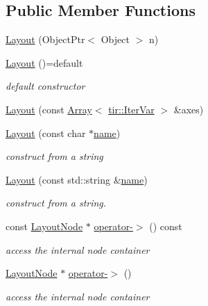 \subsection*{Public Member Functions}
\begin{DoxyCompactItemize}
\item 
\hyperlink{classtvm_1_1tir_1_1Layout_abf3ba7ad67d43133c8f4f9beb21edf32}{Layout} (Object\+Ptr$<$ Object $>$ n)
\item 
\hyperlink{classtvm_1_1tir_1_1Layout_a585c5a7813852d9741a7a739c4e2cbad}{Layout} ()=default
\begin{DoxyCompactList}\small\item\em default constructor \end{DoxyCompactList}\item 
\hyperlink{classtvm_1_1tir_1_1Layout_ace4d6c608f7148bb2c6aefe33b4e4ab5}{Layout} (const \hyperlink{classtvm_1_1Array}{Array}$<$ \hyperlink{classtvm_1_1tir_1_1IterVar}{tir\+::\+Iter\+Var} $>$ \&axes)
\item 
\hyperlink{classtvm_1_1tir_1_1Layout_a11a8465c3cc562e408a48a7f0fd324fd}{Layout} (const char $\ast$\hyperlink{classtvm_1_1tir_1_1Layout_a9c22206c841f0f09e20d56b9c96b321d}{name})
\begin{DoxyCompactList}\small\item\em construct from a string \end{DoxyCompactList}\item 
\hyperlink{classtvm_1_1tir_1_1Layout_a7cece4c969caab17658f4e70fa6a69e5}{Layout} (const std\+::string \&\hyperlink{classtvm_1_1tir_1_1Layout_a9c22206c841f0f09e20d56b9c96b321d}{name})
\begin{DoxyCompactList}\small\item\em construct from a string. \end{DoxyCompactList}\item 
const \hyperlink{classtvm_1_1tir_1_1LayoutNode}{Layout\+Node} $\ast$ \hyperlink{classtvm_1_1tir_1_1Layout_aef6a0989eb7c1a0b9a0707a465cbaa9b}{operator-\/$>$} () const 
\begin{DoxyCompactList}\small\item\em access the internal node container \end{DoxyCompactList}\item 
\hyperlink{classtvm_1_1tir_1_1LayoutNode}{Layout\+Node} $\ast$ \hyperlink{classtvm_1_1tir_1_1Layout_a24d1414e53ab3bd153942bf5de5402e2}{operator-\/$>$} ()
\begin{DoxyCompactList}\small\item\em access the internal node container \end{DoxyCompactList}\item 

\end{DoxyCompactItemize}

